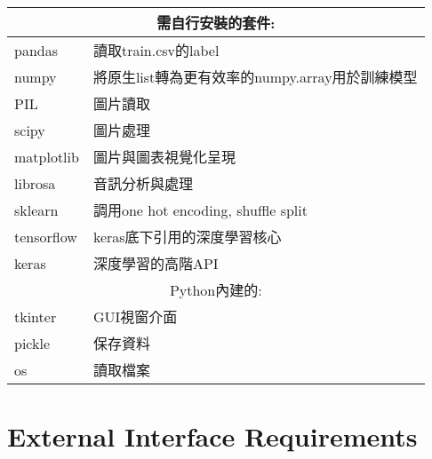 \documentclass{scrreprt}
\begin{document}
\begin{CJK*}{UTF8}{bsmi}
\begin{center}
\begin{tabular}{|l|l|}
\hline \multicolumn{2}{|c|}{需自行安裝的套件:} \\\hline
pandas  & 讀取train.csv的label  \\ \hline
numpy  & 將原生list轉為更有效率的numpy.array用於訓練模型  \\ \hline
PIL  & 圖片讀取  \\\hline
scipy & 圖片處理 \\\hline
matplotlib  & 圖片與圖表視覺化呈現  \\\hline
librosa  & 音訊分析與處理  \\\hline
sklearn  & 調用one hot encoding, shuffle split  \\\hline
tensorflow  & keras底下引用的深度學習核心  \\\hline
keras  & 深度學習的高階API  \\
\hline \multicolumn{2}{|c|}{Python內建的:} \\\hline
tkinter       & GUI視窗介面  \\ \hline
pickle        & 保存資料  \\ \hline
os  & 讀取檔案  \\\hline

\end{tabular}
\end{center}

\chapter{External Interface Requirements}

\end{CJK*}
\end{document}
